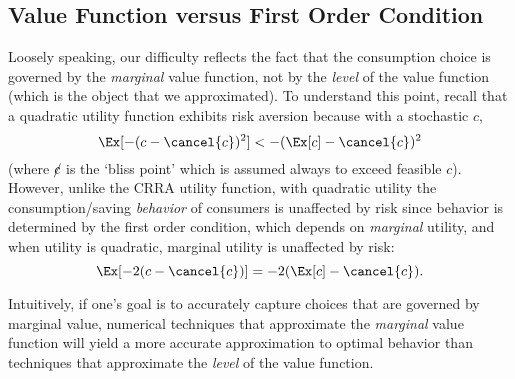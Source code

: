 \documentclass[\econtexRoot/SolvingMicroDSOPs]{subfiles}
\begin{document}
\hypertarget{value-function-versus-first-order-condition}{}
\subsection{Value Function versus First Order Condition}\label{subsec:vVsuP}

Loosely speaking, our difficulty reflects the fact that the
consumption choice is governed by the \textit{marginal} value function,
not by the \textit{level} of the value function (which is the object that
we approximated).  To understand this point, recall that a quadratic
utility function
 exhibits
risk aversion because with a stochastic $c$,
\begin{equation}
  \Ex[-(c - \cancel{c})^{2}] < - (\Ex[c] - \cancel{c})^{2}
\end{equation}
(where $\cancel{c}$ is the `bliss point' which is assumed always to exceed feasible $c$). However, unlike the CRRA utility function,
with quadratic utility the consumption/saving \textit{behavior} of consumers
is unaffected by risk since behavior is determined by the first order condition, which
depends on \textit{marginal} utility, and when utility is quadratic, marginal utility is unaffected
by risk:
\begin{equation}
  \Ex[-2(c - \cancel{c})] = - 2(\Ex[c] - \cancel{c}).
\end{equation}

Intuitively, if one's goal is to accurately capture choices
that are governed by marginal value,
numerical techniques that approximate the \textit{marginal} value
function will yield a more accurate approximation to
optimal behavior than techniques that approximate the \textit{level}
of the value function.
\end{document}
